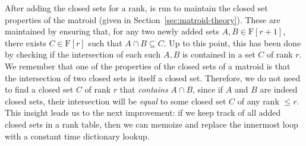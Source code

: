 After adding the closed sets for a rank,  is run to maintain the closed set properties of the matroid (given in Section~\ref{sec:matroid-theory}). These are maintained by ensuring that, for any two newly added sets $A,B \in \mathrm{F}[r+1]$, there exists $C \in \mathrm{F}[r]$ such that $A \cap B \subseteq C$. Up to this point, this has been done by checking if the intersection of each such $A,B$ is contained in a set $C$ of rank $r$. We remember that one of the properties of the closed sets of a matroid is that the intersection of two closed sets is itself a closed set. Therefore, we do not need to find a closed set $C$ of rank $r$ that \textit{contains} $A \cap B$, since if $A$ and $B$ are indeed closed sets, their intersection will be \textit{equal} to some closed set $C$ of any rank $\leq r$. This insight leads us to the next improvement: if we keep track of all added closed sets in a rank table, then we can memoize  and replace the innermost loop with a constant time dictionary lookup.

